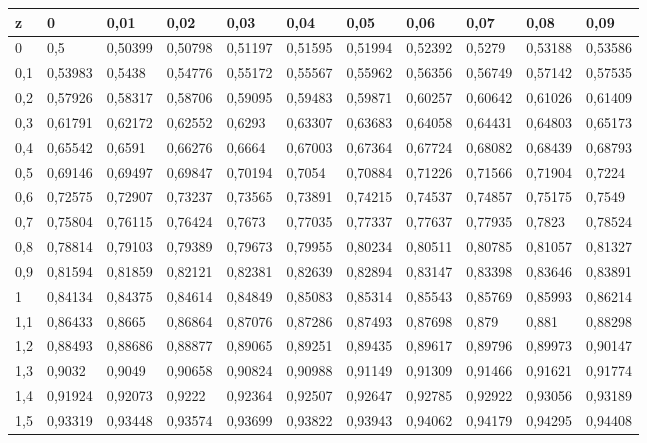 \documentclass[spanish, 11pt]{exam}
\begin{document}
        \begin{center}
        \begin{tabular}{l|llllllllll}
z   & 0       & 0,01    & 0,02    & 0,03    & 0,04    & 0,05    & 0,06    & 0,07    & 0,08    & 0,09    \\
\hline
0   & 0,5     & 0,50399 & 0,50798 & 0,51197 & 0,51595 & 0,51994 & 0,52392 & 0,5279  & 0,53188 & 0,53586 \\
0,1 & 0,53983 & 0,5438  & 0,54776 & 0,55172 & 0,55567 & 0,55962 & 0,56356 & 0,56749 & 0,57142 & 0,57535 \\
0,2 & 0,57926 & 0,58317 & 0,58706 & 0,59095 & 0,59483 & 0,59871 & 0,60257 & 0,60642 & 0,61026 & 0,61409 \\
0,3 & 0,61791 & 0,62172 & 0,62552 & 0,6293  & 0,63307 & 0,63683 & 0,64058 & 0,64431 & 0,64803 & 0,65173 \\
0,4 & 0,65542 & 0,6591  & 0,66276 & 0,6664  & 0,67003 & 0,67364 & 0,67724 & 0,68082 & 0,68439 & 0,68793 \\
0,5 & 0,69146 & 0,69497 & 0,69847 & 0,70194 & 0,7054  & 0,70884 & 0,71226 & 0,71566 & 0,71904 & 0,7224  \\
0,6 & 0,72575 & 0,72907 & 0,73237 & 0,73565 & 0,73891 & 0,74215 & 0,74537 & 0,74857 & 0,75175 & 0,7549  \\
0,7 & 0,75804 & 0,76115 & 0,76424 & 0,7673  & 0,77035 & 0,77337 & 0,77637 & 0,77935 & 0,7823  & 0,78524 \\
0,8 & 0,78814 & 0,79103 & 0,79389 & 0,79673 & 0,79955 & 0,80234 & 0,80511 & 0,80785 & 0,81057 & 0,81327 \\
0,9 & 0,81594 & 0,81859 & 0,82121 & 0,82381 & 0,82639 & 0,82894 & 0,83147 & 0,83398 & 0,83646 & 0,83891 \\
1   & 0,84134 & 0,84375 & 0,84614 & 0,84849 & 0,85083 & 0,85314 & 0,85543 & 0,85769 & 0,85993 & 0,86214 \\
1,1 & 0,86433 & 0,8665  & 0,86864 & 0,87076 & 0,87286 & 0,87493 & 0,87698 & 0,879   & 0,881   & 0,88298 \\
1,2 & 0,88493 & 0,88686 & 0,88877 & 0,89065 & 0,89251 & 0,89435 & 0,89617 & 0,89796 & 0,89973 & 0,90147 \\
1,3 & 0,9032  & 0,9049  & 0,90658 & 0,90824 & 0,90988 & 0,91149 & 0,91309 & 0,91466 & 0,91621 & 0,91774 \\
1,4 & 0,91924 & 0,92073 & 0,9222  & 0,92364 & 0,92507 & 0,92647 & 0,92785 & 0,92922 & 0,93056 & 0,93189 \\
1,5 & 0,93319 & 0,93448 & 0,93574 & 0,93699 & 0,93822 & 0,93943 & 0,94062 & 0,94179 & 0,94295 & 0,94408 \\

\end{tabular}
\end{center}
\end{document}
